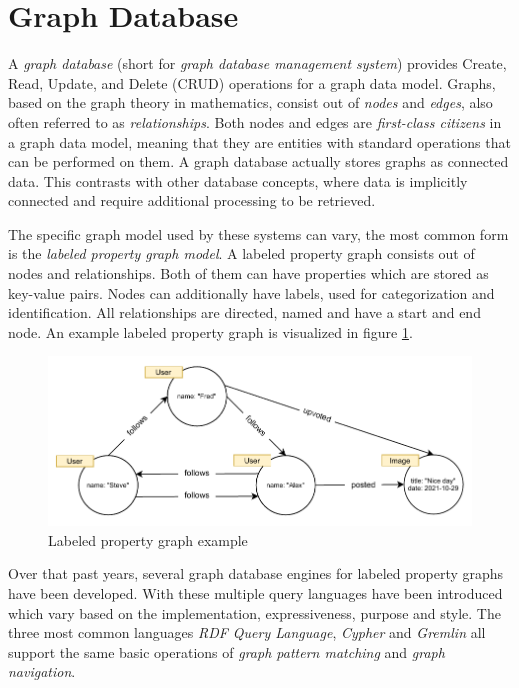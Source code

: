 \section{Graph Database} \label{sec:gdb}

A \emph{graph database} (short for \emph{graph database management system}) provides Create, Read, Update, and Delete (CRUD) operations for a graph data model. Graphs, based on the graph theory in mathematics, consist out of \emph{nodes} and \emph{edges}, also often referred to as \emph{relationships}. Both nodes and edges are \emph{first-class citizens} in a graph data model, meaning that they are entities with standard operations that can be performed on them. A graph database actually stores graphs as connected data. This contrasts with other database concepts, where data is implicitly connected and require additional processing to be retrieved. \cite[p.~1,~5,~6,~19]{robinson2015}


The specific graph model used by these systems can vary, the most common form is the \emph{labeled property graph model}. A labeled property graph consists out of nodes and relationships. Both of them can have properties which are stored as key-value pairs. Nodes can additionally have labels, used for categorization and identification. All relationships are directed, named and have a start and end node. \cite[p.~4]{robinson2015} An example labeled property graph is visualized in figure \ref{fig:gdb.graph}.

\begin{figure}[H]
    \centering
    \includegraphics[width=0.9\columnwidth]{res/gdb-graph.pdf}
    \caption{Labeled property graph example}
    \label{fig:gdb.graph}
\end{figure}

Over that past years, several graph database engines for labeled property graphs have been developed. With these multiple query languages have been introduced which vary based on the implementation, expressiveness, purpose and style. The three most common languages \emph{RDF Query Language}, \emph{Cypher} and \emph{Gremlin} all support the same basic operations of \emph{graph pattern matching} and \emph{graph navigation}. \cite[p.~8]{angles2017}

